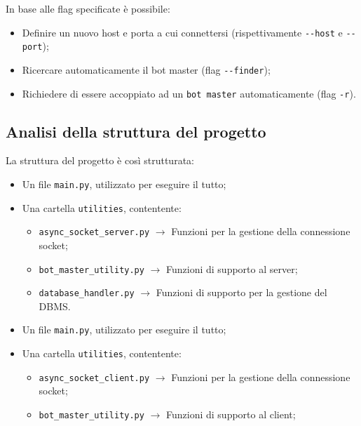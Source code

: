 \documentclass[letterpaper, 11pt]{article}
\begin{document}
In base alle flag specificate è possibile:
\begin{itemize}
\item Definire un nuovo host e porta a cui connettersi (rispettivamente \texttt{-{}-host} e \texttt{-{}-port});
\item Ricercare automaticamente il bot master (flag \texttt{-{}-finder});
\item Richiedere di essere accoppiato ad un \texttt{bot master} automaticamente (flag \texttt{-r}).
\end{itemize}
\subsection{Analisi della struttura del progetto}
\label{Analisi progetto}
La struttura del progetto è così strutturata:

\noindent
\begin{minipage}[t]{0.47\textwidth}
  \begin{itemize}
    \item Un file \texttt{main.py}, utilizzato per eseguire il tutto;
    \item Una cartella \texttt{utilities}, contentente:
    \begin{itemize}
      \item \texttt{async\_socket\_server.py} $\rightarrow$ Funzioni per la gestione della connessione socket;
      \item \texttt{bot\_master\_utility.py} $\rightarrow$ Funzioni di supporto al server;
      \item \texttt{database\_handler.py} $\rightarrow$ Funzioni di supporto per la gestione del DBMS.
    \end{itemize}
  \end{itemize}
\end{minipage}
\hfill
\noindent
\begin{minipage}[t]{0.47\textwidth}
  \begin{itemize}
    \item Un file \texttt{main.py}, utilizzato per eseguire il tutto;
    \item Una cartella \texttt{utilities}, contentente:
    \begin{itemize}
      \item \texttt{async\_socket\_client.py} $\rightarrow$ Funzioni per la gestione della connessione socket;
      \item \texttt{bot\_master\_utility.py} $\rightarrow$ Funzioni di supporto al client;
    \end{itemize}
  \end{itemize}
\end{minipage}
\end{document}
